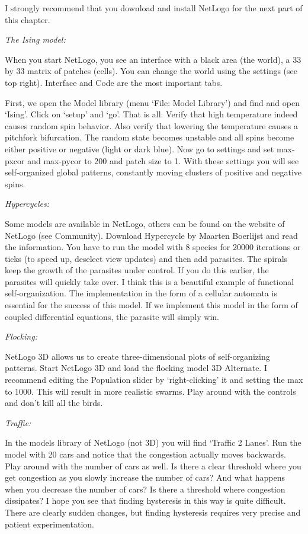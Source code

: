 \documentclass[
  a4paper,
  DIV=11,
  numbers=noendperiod]{scrreprt}
\begin{document}
I strongly recommend that you download and install NetLogo for the next
part of this chapter.

\emph{The Ising model:}

When you start NetLogo, you see an interface with a black area (the
world), a 33 by 33 matrix of patches (cells). You can change the world
using the settings (see top right). Interface and Code are the most
important tabs.

First, we open the Model library (menu `File: Model Library') and find
and open `Ising'. Click on `setup' and `go'. That is all. Verify that
high temperature indeed causes random spin behavior. Also verify that
lowering the temperature causes a pitchfork bifurcation. The random
state becomes unstable and all spins become either positive or negative
(light or dark blue). Now go to settings and set max-pxcor and max-pycor
to 200 and patch size to 1. With these settings you will see
self-organized global patterns, constantly moving clusters of positive
and negative spins.

\emph{Hypercycles:}

Some models are available in NetLogo, others can be found on the website
of NetLogo (see Community). Download Hypercycle by Maarten Boerlijst and
read the information. You have to run the model with 8 species for 20000
iterations or ticks (to speed up, deselect view updates) and then add
parasites. The spirals keep the growth of the parasites under control.
If you do this earlier, the parasites will quickly take over. I think
this is a beautiful example of functional self-organization. The
implementation in the form of a cellular automata is essential for the
success of this model. If we implement this model in the form of coupled
differential equations, the parasite will simply win.

\emph{Flocking:}

NetLogo 3D allows us to create three-dimensional plots of
self-organizing patterns. Start NetLogo 3D and load the flocking model
3D Alternate. I recommend editing the Population slider by
`right-clicking' it and setting the max to 1000. This will result in
more realistic swarms. Play around with the controls and don't kill all
the birds.

\emph{Traffic:}

In the models library of NetLogo (not 3D) you will find `Traffic 2
Lanes'. Run the model with 20 cars and notice that the congestion
actually moves backwards. Play around with the number of cars as well.
Is there a clear threshold where you get congestion as you slowly
increase the number of cars? And what happens when you decrease the
number of cars? Is there a threshold where congestion dissipates? I hope
you see that finding hysteresis in this way is quite difficult. There
are clearly sudden changes, but finding hysteresis requires very precise
and patient experimentation.
\end{document}

